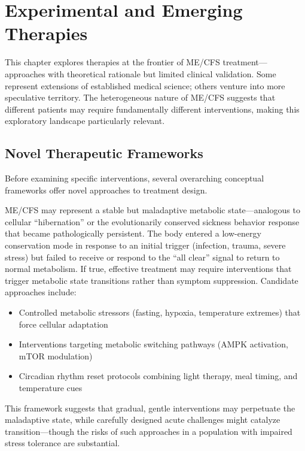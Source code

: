 \chapter{Experimental and Emerging Therapies}
\label{ch:emerging-therapies}

This chapter explores therapies at the frontier of ME/CFS treatment---approaches with theoretical rationale but limited clinical validation. Some represent extensions of established medical science; others venture into more speculative territory. The heterogeneous nature of ME/CFS suggests that different patients may require fundamentally different interventions, making this exploratory landscape particularly relevant.

\section{Novel Therapeutic Frameworks}
\label{sec:novel-frameworks}

Before examining specific interventions, several overarching conceptual frameworks offer novel approaches to treatment design.

\begin{hypothesis}
ME/CFS may represent a stable but maladaptive metabolic state---analogous to cellular ``hibernation'' or the evolutionarily conserved sickness behavior response that became pathologically persistent. The body entered a low-energy conservation mode in response to an initial trigger (infection, trauma, severe stress) but failed to receive or respond to the ``all clear'' signal to return to normal metabolism. If true, effective treatment may require interventions that trigger metabolic state transitions rather than symptom suppression. Candidate approaches include:
\begin{itemize}
    \item Controlled metabolic stressors (fasting, hypoxia, temperature extremes) that force cellular adaptation
    \item Interventions targeting metabolic switching pathways (AMPK activation, mTOR modulation)
    \item Circadian rhythm reset protocols combining light therapy, meal timing, and temperature cues
\end{itemize}
This framework suggests that gradual, gentle interventions may perpetuate the maladaptive state, while carefully designed acute challenges might catalyze transition---though the risks of such approaches in a population with impaired stress tolerance are substantial.
\end{hypothesis}

